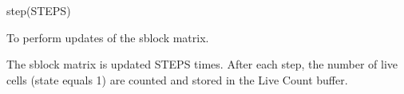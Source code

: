 

\format

step(STEPS)

\purpose

To perform updates of the sblock matrix.

\description

The sblock matrix is updated STEPS times.
After each step, the number of live cells (state equals 1) are counted and stored in the Live Count buffer.
